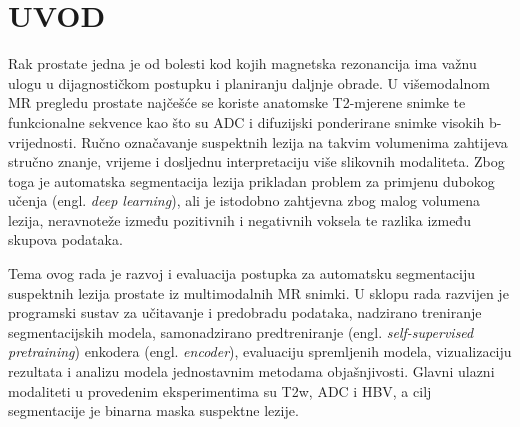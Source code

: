 \documentclass[a4paper,12pt,oneside]{article}
\let\sectionwithoutpagebreak\section
\renewcommand{\section}{\clearpage\sectionwithoutpagebreak}%
\begin{document}



%
%





{
	\hypersetup{linkcolor=black}
	\tableofcontents
}



\newpage
{}
\setcounter{page}{1}
\hypersetup{pageanchor=true}

\section{UVOD}

Rak prostate jedna je od bolesti kod kojih magnetska rezonancija ima važnu ulogu u dijagnostičkom postupku i planiranju daljnje obrade. U višemodalnom MR pregledu prostate najčešće se koriste anatomske T2-mjerene snimke te funkcionalne sekvence kao što su ADC i difuzijski ponderirane snimke visokih b-vrijednosti. Ručno označavanje suspektnih lezija na takvim volumenima zahtijeva stručno znanje, vrijeme i dosljednu interpretaciju više slikovnih modaliteta. Zbog toga je automatska segmentacija lezija prikladan problem za primjenu dubokog učenja (engl. \textit{deep learning}), ali je istodobno zahtjevna zbog malog volumena lezija, neravnoteže između pozitivnih i negativnih voksela te razlika između skupova podataka.

Tema ovog rada je razvoj i evaluacija postupka za automatsku segmentaciju suspektnih lezija prostate iz multimodalnih MR snimki. U sklopu rada razvijen je programski sustav za učitavanje i predobradu podataka, nadzirano treniranje segmentacijskih modela, samonadzirano predtreniranje (engl. \textit{self-supervised pretraining}) enkodera (engl. \textit{encoder}), evaluaciju spremljenih modela, vizualizaciju rezultata i analizu modela jednostavnim metodama objašnjivosti. Glavni ulazni modaliteti u provedenim eksperimentima su T2w, ADC i HBV, a cilj segmentacije je binarna maska suspektne lezije.
\end{document}
